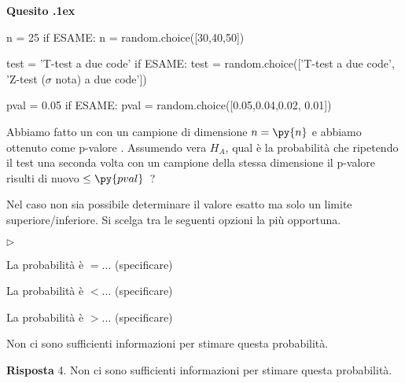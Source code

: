 \documentclass[11pt,twoside,a4paper]{article}
\newcommand{\mylabel}[1]{#1\hfill}
\renewenvironment{itemize}
  {\begin{list}{$\triangleright$}{%
   \setlength{\parskip}{0mm}
   \setlength{\topsep}{.4\baselineskip}
   \setlength{\rightmargin}{0mm}
   \setlength{\listparindent}{0mm}
   \setlength{\itemindent}{0mm}
   \setlength{\labelwidth}{2ex}
   \setlength{\itemsep}{.4\baselineskip}
   \setlength{\parsep}{0mm}
   \setlength{\partopsep}{0mm}
   \setlength{\labelsep}{1ex}
   \setlength{\leftmargin}{\labelwidth+\labelsep}
   \let\makelabel\mylabel}}{%
   \end{list}\vspace*{-1.3mm}}
\newcounter{quesito}
\newenvironment{question}{\bigskip\addtocounter{quesito}{1}\par\textbf{Quesito \thequesito.\kern1ex}}{\vspace{\parskip}}
\newenvironment{answer}{\par\textbf{Risposta\quad}}{\vspace{\parskip}}
\begin{document}
\begin{question} %
\begin{pycode}
n = 25
if ESAME: n = random.choice([30,40,50])

test = 'T-test a due code'
if ESAME: test = random.choice(['T-test a due code', 'Z-test ($\sigma$ nota) a due code'])

pval = 0.05
if ESAME: pval = random.choice([0.05,0.04,0.02, 0.01])
\end{pycode}
Abbiamo fatto un  con un campione di dimensione $n=\py{n}$ e abbiamo ottenuto come p-valore .
Assumendo vera $H_A$, qual è la probabilità che ripetendo il test una seconda volta con un campione della stessa dimensione il p-valore risulti di nuovo $\le\py{pval}$~?

Nel caso non sia possibile determinare il valore esatto ma solo un limite superiore/inferiore. Si scelga tra le seguenti opzioni la più opportuna.
\begin{itemize}
\item[1.] La probabilità è $=\dots$ (specificare)
\item[2.] La probabilità è $<\dots$ (specificare)
\item[3.] La probabilità è $>\dots$ (specificare)
\item[4.] Non ci sono sufficienti informazioni per stimare questa probabilità.
\end{itemize}
\begin{answer}
{\color{blue}4. Non ci sono sufficienti informazioni per stimare questa probabilità.}
\end{answer}
\end{question}
\end{document}
